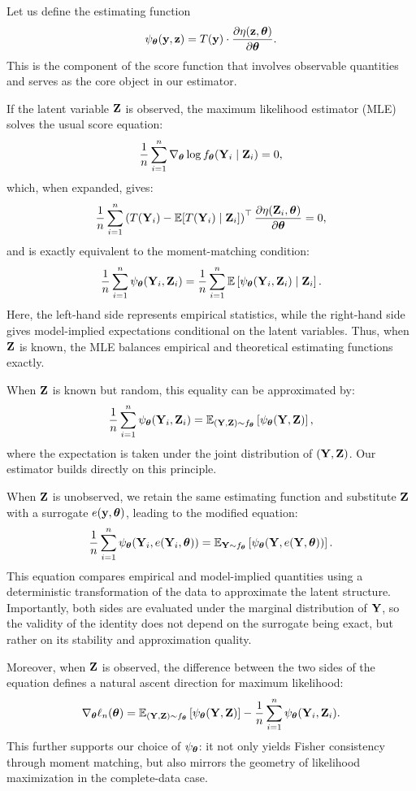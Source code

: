 \documentclass[twoside,11pt]{article}
\begin{document}
Let us define the estimating function
\[
\psi_{\bm{\theta}}({\bf y}, {\bf z}) = T({\bf y}) \cdot \frac{\partial \eta({\bf z}, {\bm{\theta}})}{\partial {\bm{\theta}}}.
\]
This is the component of the score function that involves observable quantities and serves as the core object in our estimator.

If the latent variable \({\bf Z}\) is observed, the maximum likelihood estimator (MLE) solves the usual score equation:
\[
\frac{1}{n} \sum_{i=1}^n \nabla_{\bm{\theta}} \log f_{\bm{\theta}}({\bf Y}_i \mid {\bf Z}_i) = 0,
\]
which, when expanded, gives:
\[
\frac{1}{n} \sum_{i=1}^n \left( T({\bf Y}_i) - \mathbb{E}[T({\bf Y}_i) \mid {\bf Z}_i] \right)^\top \frac{\partial \eta({\bf Z}_i, {\bm{\theta}})}{\partial {\bm{\theta}}} = 0,
\]
and is exactly equivalent to the moment-matching condition:
\[
\frac{1}{n} \sum_{i=1}^n \psi_{\bm{\theta}}({\bf Y}_i, {\bf Z}_i)
=
\frac{1}{n} \sum_{i=1}^n \mathbb{E}\left[ \psi_{\bm{\theta}}({\bf Y}_i, {\bf Z}_i) \mid {\bf Z}_i \right].
\]
Here, the left-hand side represents empirical statistics, while the right-hand side gives model-implied expectations conditional on the latent variables. Thus, when \({\bf Z}\) is known, the MLE balances empirical and theoretical estimating functions exactly.

When \({\bf Z}\) is known but random, this equality can be approximated by:
\[
\frac{1}{n} \sum_{i=1}^n \psi_{\bm{\theta}}({\bf Y}_i, {\bf Z}_i)
= \mathbb{E}_{({\bf Y}, {\bf Z}) \sim f_{\bm{\theta}}}\left[ \psi_{\bm{\theta}}({\bf Y}, {\bf Z}) \right],
\]
where the expectation is taken under the joint distribution of \(({\bf Y}, {\bf Z})\). Our estimator builds directly on this principle.

When \({\bf Z}\) is unobserved, we retain the same estimating function and substitute \({\bf Z}\) with a surrogate \( e({\bf y}, {\bm{\theta}}) \), leading to the modified equation:
\[
\frac{1}{n} \sum_{i=1}^n \psi_{\bm{\theta}}({\bf Y}_i, e({\bf Y}_i, {\bm{\theta}})) 
=
\mathbb{E}_{{\bf Y} \sim f_{\bm{\theta}}} \left[ \psi_{\bm{\theta}}({\bf Y}, e({\bf Y}, {\bm{\theta}})) \right].
\]
This equation compares empirical and model-implied quantities using a deterministic transformation of the data to approximate the latent structure. Importantly, both sides are evaluated under the marginal distribution of \({\bf Y}\), so the validity of the identity does not depend on the surrogate being exact, but rather on its stability and approximation quality.

Moreover, when \({\bf Z}\) is observed, the difference between the two sides of the equation defines a natural ascent direction for maximum likelihood:
\[
\nabla_{\bm{\theta}} \ell_n({\bm{\theta}}) 
= 
\mathbb{E}_{({\bf Y}, {\bf Z}) \sim f_{\bm{\theta}}} \left[ \psi_{\bm{\theta}}({\bf Y}, {\bf Z}) \right] 
- 
\frac{1}{n} \sum_{i=1}^n \psi_{\bm{\theta}}({\bf Y}_i, {\bf Z}_i).
\]
This further supports our choice of \(\psi_{\bm{\theta}}\): it not only yields Fisher consistency through moment matching, but also mirrors the geometry of likelihood maximization in the complete-data case.
\end{document}
